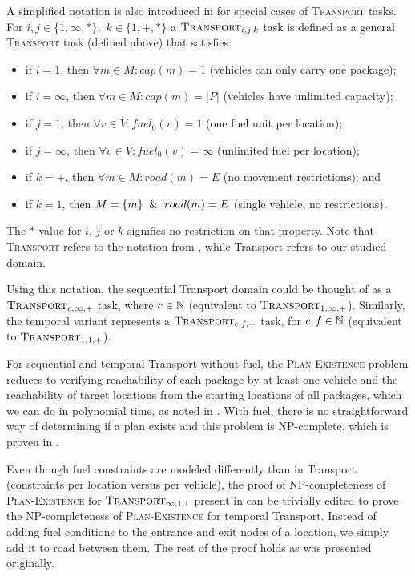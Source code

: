 A simplified notation is also introduced in \citet{Helmert2001a} for special cases of \textsc{Transport} tasks.
For $i,j \in \{1, \infty, *\},$ $k \in \{1, +, *\}$ a $\textsc{Transport}_{i,j,k}$ task is defined as a
general \textsc{Transport} task (defined above) that satisfies:
\begin{itemize}
\item if $i=1$, then $\forall m \in M : cap(m) = 1$ (vehicles can only carry one package);
\item if $i=\infty$, then $\forall m \in M : cap(m) = |P|$ (vehicles have unlimited capacity);
\item if $j=1$, then $\forall v \in V : fuel_0(v) = 1$ (one fuel unit per location);
\item if $j=\infty$, then $\forall v \in V : fuel_0(v) = \infty$ (unlimited fuel per location);
\item if $k=+$, then $\forall m \in M : road(m) = E$ (no movement restrictions); and
\item if $k=1$, then $M = \{m\} \And road(m) = E$ (single vehicle, no restrictions).
\end{itemize}
The $*$ value for $i$, $j$ or $k$ signifies no restriction on that property.
Note that
\textsc{Transport} refers to the notation from \citet{Helmert2001a}, while Transport refers to our studied domain.

Using this notation, the sequential Transport domain could be thought of as a $\textsc{Transport}_{c,\infty,+}$ task, where $c \in \mathbb{N}$
(equivalent to $\textsc{Transport}_{1,\infty,+}$).
Similarly, the temporal variant represents a $\textsc{Transport}_{c,f,+}$ task, for $c, f \in \mathbb{N}$
(equivalent to $\textsc{Transport}_{1,1,+}$).

For sequential and temporal Transport without fuel, the \textsc{Plan-Existence} problem
reduces to verifying reachability of each package by at least one vehicle
and the reachability of target locations from the starting locations of all packages,
which we can do in polynomial time, as noted in \citet[Theorem 8]{Helmert2001}.
With fuel, there is no straightforward way of determining
if a plan exists and this problem is NP-complete, which is proven in \citet[Theorem 9 and 10]{Helmert2001}.

Even though fuel constraints are modeled differently than in Transport (constraints per location versus per vehicle), the proof of 
NP-completeness of \textsc{Plan-Existence} for $\textsc{Transport}_{\infty,1,1}$
present in \citet[Theorem~3.9]{Helmert2001a}
can be trivially edited to prove the NP-completeness
of \textsc{Plan-Existence} for temporal Transport.
Instead of adding fuel conditions
to the entrance and exit nodes of a location,
we simply add it to road between them. The rest of the proof holds as was presented originally.

